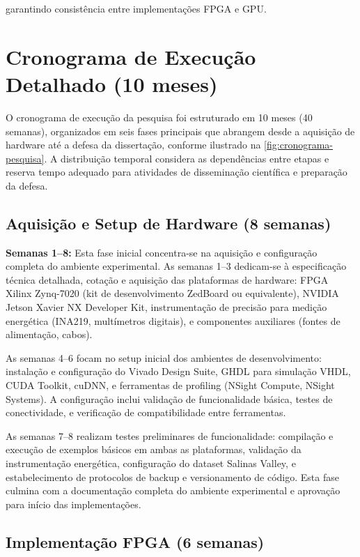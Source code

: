 garantindo consistência entre implementações FPGA e GPU.


\section{Cronograma de Execução Detalhado (10 meses)}\label{sec:cronograma_execucao}

O cronograma de execução da pesquisa foi estruturado em 10 meses (40 semanas), 
organizados em seis fases principais que abrangem desde a aquisição de hardware 
até a defesa da dissertação, conforme ilustrado na \autoref{fig:cronograma-pesquisa}. 
A distribuição temporal considera as dependências entre etapas e reserva tempo 
adequado para atividades de disseminação científica e preparação da defesa.

\subsection{Aquisição e Setup de Hardware (8 semanas)}\label{subsec:fase1_hardware}

\textbf{Semanas 1--8:} Esta fase inicial concentra-se na aquisição 
e configuração completa do ambiente experimental. As semanas 1--3 dedicam-se à 
especificação técnica detalhada, cotação e aquisição das plataformas de hardware: 
FPGA Xilinx Zynq-7020 (kit de desenvolvimento ZedBoard ou equivalente), NVIDIA 
Jetson Xavier NX Developer Kit, instrumentação de precisão para medição energética 
(INA219, multímetros digitais), e componentes auxiliares (fontes de alimentação, 
cabos).

As semanas 4--6 focam no setup inicial dos ambientes de desenvolvimento: 
instalação e configuração do Vivado Design Suite, GHDL para simulação 
VHDL, CUDA Toolkit, cuDNN, e ferramentas de profiling (NSight Compute, 
NSight Systems). A configuração inclui validação de funcionalidade básica, 
testes de conectividade, e verificação de compatibilidade entre ferramentas.

As semanas 7--8 realizam testes preliminares de funcionalidade: compilação e 
execução de exemplos básicos em ambas as plataformas, validação da instrumentação 
energética, configuração do dataset Salinas Valley, e estabelecimento de 
protocolos de backup e versionamento de código. Esta fase culmina com a 
documentação completa do ambiente experimental e aprovação para início das 
implementações.

\subsection{Implementação FPGA (6 semanas)}\label{subsec:fase2_fpga}

